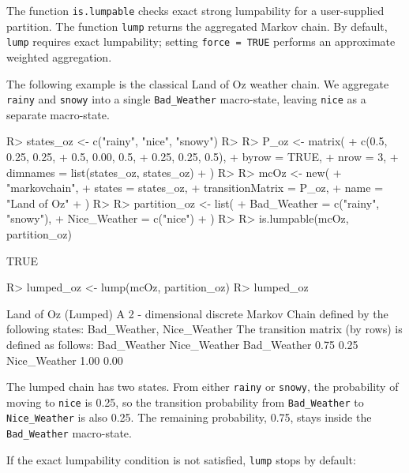 \documentclass[
  nojss]{jss}
\begin{document}
The function \texttt{is.lumpable} checks exact strong lumpability for a user-supplied
partition. The function \texttt{lump} returns the aggregated Markov chain. By default,
\texttt{lump} requires exact lumpability; setting \texttt{force\ =\ TRUE} performs an approximate
weighted aggregation.

The following example is the classical Land of Oz weather chain. We aggregate
\texttt{rainy} and \texttt{snowy} into a single \texttt{Bad\_Weather} macro-state, leaving \texttt{nice} as a
separate macro-state.

\begin{CodeChunk}
\begin{CodeInput}
R> states_oz <- c("rainy", "nice", "snowy")
R> 
R> P_oz <- matrix(
+   c(0.5,  0.25, 0.25,
+     0.5,  0.00, 0.5,
+     0.25, 0.25, 0.5),
+   byrow = TRUE,
+   nrow = 3,
+   dimnames = list(states_oz, states_oz)
+ )
R> 
R> mcOz <- new(
+   "markovchain",
+   states = states_oz,
+   transitionMatrix = P_oz,
+   name = "Land of Oz"
+ )
R> 
R> partition_oz <- list(
+   Bad_Weather = c("rainy", "snowy"),
+   Nice_Weather = c("nice")
+ )
R> 
R> is.lumpable(mcOz, partition_oz)
\end{CodeInput}
\begin{CodeOutput}
[1] TRUE
\end{CodeOutput}
\begin{CodeInput}
R> lumped_oz <- lump(mcOz, partition_oz)
R> lumped_oz
\end{CodeInput}
\begin{CodeOutput}
Land of Oz (Lumped) 
 A  2 - dimensional discrete Markov Chain defined by the following states: 
 Bad_Weather, Nice_Weather 
 The transition matrix  (by rows)  is defined as follows: 
             Bad_Weather Nice_Weather
Bad_Weather         0.75         0.25
Nice_Weather        1.00         0.00
\end{CodeOutput}
\end{CodeChunk}

The lumped chain has two states. From either \texttt{rainy} or \texttt{snowy}, the probability
of moving to \texttt{nice} is 0.25, so the transition probability from \texttt{Bad\_Weather} to
\texttt{Nice\_Weather} is also 0.25. The remaining probability, 0.75, stays inside the
\texttt{Bad\_Weather} macro-state.

If the exact lumpability condition is not satisfied, \texttt{lump} stops by default:
\end{document}
